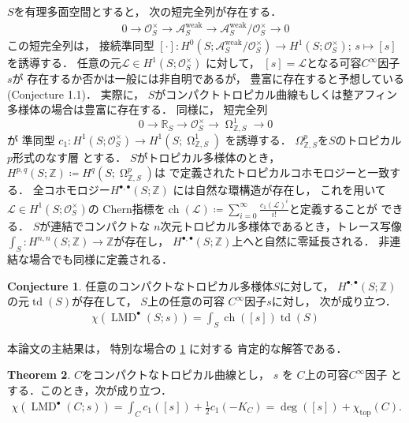\documentclass[uplatex,dvipdfmx,12pt]{jsarticle}
\numberwithin{equation}{section}
\theoremstyle{definition}
\newtheorem{theorem}{Theorem}[section]
\newtheorem{conjecture}[theorem]{Conjecture}
\newcommand{\deq}{\coloneqq}
\newcommand{\opn}[1]{\operatorname{#1}}
\DeclareMathOperator{\tform}{\Omega}
\begin{document}
$S$を有理多面空間とすると，
次の短完全列が存在する．
\begin{align}
0\to \mathcal{O}_S^{\times} \to 
\mathcal{A}^{\mathrm{weak}}_S \to 
\mathcal{A}^{\mathrm{weak}}_S/\mathcal{O}_S^{\times}
\to 0
\end{align}
この短完全列は，
接続準同型
$
[\cdot] \colon 
H^{0}(S;\mathcal{A}^{\mathrm{weak}}_S/\mathcal{O}_S^{\times})
\to H^{1}(S;\mathcal{O}_S^{\times})
$;
$
s\mapsto [s]
$
を誘導する．
任意の元$\mathcal{L}\in H^{1}(S;\mathcal{O}^{\times}_S)$
に対して，
$[s]=\mathcal{L}$となる可容$C^{\infty}$因子
$s$が
存在するか否かは一般には非自明であるが，
豊富に存在すると予想している(Conjecture 1.1)．
実際に，
$S$がコンパクトトロピカル曲線もしくは整アフィン多様体の場合は豊富に存在する．
同様に，
短完全列
\begin{equation}
0
\to \mathbb{R}_S
\to \mathcal{O}^{\times}_S
\to \tform_{\mathbb{Z},S}^{1}
\to 0
\end{equation}
が
準同型
$
c_1\colon H^{1}(S;\mathcal{O}^{\times}_S)
\to H^{1}(S;\tform_{\mathbb{Z},S}^{1})
$
を誘導する．
$\Omega_{\mathbb{Z},S}^{p}$を$S$のトロピカル$p$形式のなす層
とする\cite{gross2019sheaftheoretic}．
$S$がトロピカル多様体のとき，
$H^{p,q}(S;\mathbb{Z})\deq H^{q}(S;\tform_{\mathbb{Z},S}^{p})$は
\cite{mikhalkinTropicalEigenwaveIntermediate2014a}
で定義されたトロピカルコホモロジーと一致する．
全コホモロジー$H^{\bullet,\bullet}(S;\mathbb{Z})$
には自然な環構造が存在し，
これを用いて
$\mathcal{L}\in H^{1}(S;\mathcal{O}_S^{\times})$の
Chern指標を$\opn{ch}(\mathcal{L})\deq
\sum_{i=0}^{\infty}\frac{c_1(\mathcal{L})^{i}}{i!}$と定義することが
できる．
$S$が連結でコンパクトな
$n$次元トロピカル多様体であるとき，トレース写像
$\int_{S}\colon H^{n,n}(S;\mathbb{Z})\to \mathbb{Z}$が存在し，
$H^{\bullet,\bullet}(S;\mathbb{Z})$上へと自然に零延長される．
非連結な場合でも同様に定義される．
\setcounter{section}{1}
\setcounter{condition}{1}
\begin{conjecture} \label{conjecture-mirror-tropical-rr}
任意のコンパクトなトロピカル多様体$S$に対して，
$H^{\bullet,\bullet}(S;\mathbb{Z})$
の元$\opn{td}(S)$が存在して，
$S$上の任意の可容
$C^{\infty}$因子$s$に対し，
次が成り立つ．
\begin{align}
\chi(\opn{LMD}^{\bullet}(S;s))=
\int_{S}\opn{ch}([s])\opn{td}(S)
\end{align}
\end{conjecture}


本論文の主結果は，
特別な場合の
\cref{conjecture-mirror-tropical-rr}
に対する
肯定的な解答である．

\begin{theorem} \label{theorem-main-1}
$C$をコンパクトなトロピカル曲線とし，
$s$ を $C$上の可容$C^{\infty}$因子 
とする．このとき，次が成り立つ．
\begin{align}
\chi(\opn{LMD}^{\bullet}(C;s))=
\int_C c_1([s])+\frac{1}{2}c_1(-K_C)
=\opn{deg}([s])+\chi_{\opn{top}}(C). 
\end{align}
\end{theorem}
\end{document}
